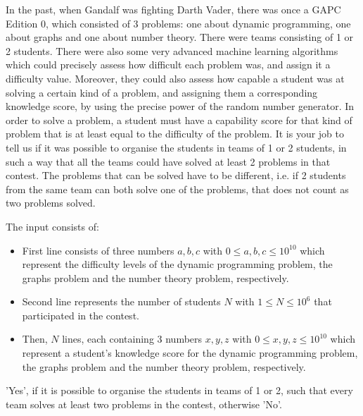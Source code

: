 

\newcommand{\maxa}{123456789}

In the past, when Gandalf was fighting Darth Vader, there was once a GAPC Edition 0, which consisted of 3 problems: 
one about dynamic programming, one about graphs and one about number theory. 
There were teams consisting of 1 or 2 students. 
There were also some very advanced machine learning algorithms which could precisely assess how difficult each problem was,
and assign it a difficulty value. Moreover, they could also assess how capable a student was at solving a 
certain kind of a problem, and assigning them a corresponding knowledge score, 
by using the precise power of the random number generator. 
In order to solve a problem, a student must have a capability score for that kind of problem that 
is at least equal to the difficulty of the problem. 
It is your job to tell us if it was possible to organise the students in teams of 1 or 2 students, in such a way that all the teams could have solved at least 2 problems in that contest. 
The problems that can be solved have to be different, i.e. if 2 students from the same team can both solve one of the problems,
that does not count as two problems solved.

\begin{Input}
    The input consists of:
    \begin{itemize}
        \item First line consists of three numbers $a, b, c$ with $0 \leq a, b, c \leq 10^{10}$ which represent the difficulty levels of the dynamic programming problem, the graphs problem and the number theory problem, respectively. 
        \item Second line represents the number of students $N$ with $1 \leq N \leq 10^6$ that participated in the contest.
        \item Then, $N$ lines, each containing 3 numbers $x, y, z$ with $0 \leq x, y, z \leq 10^{10}$ which represent a student's knowledge score for the dynamic programming problem, the graphs problem and the number theory problem, respectively.
    \end{itemize}
\end{Input}

\begin{Output}
    'Yes', if it is possible to organise the students in teams of 1 or 2, such that every team solves at least two problems in the contest, otherwise 'No'.
\end{Output}
